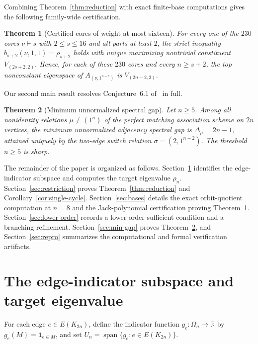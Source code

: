 \documentclass[11pt]{article}
\newtheorem{theorem}{Theorem}
\theoremstyle{remark}
\newcommand{\R}{\mathbb{R}}
\newcommand{\one}{\mathbf{1}}
\DeclareMathOperator{\spn}{span}
\begin{document}
Combining Theorem~\ref{thm:reduction} with exact finite-base computations gives
the following family-wide certification.

\begin{theorem}[Certified cores of weight at most sixteen]\label{thm:cores}
For every one of the $230$ cores $\nu \vdash s$ with $2 \le s \le 16$ and all
parts at least $2$, the strict inequality $b_{s+2}(\nu, 1, 1) = \rho_{s+2}$
holds with unique maximizing nontrivial constituent $V_{(2s+2, 2)}$. Hence, for
each of these $230$ cores and every $n \ge s+2$, the top nonconstant eigenspace
of $A_{(\nu, 1^{n-s})}$ is $V_{(2n-2,2)}$.
\end{theorem}

Our second main result resolves Conjecture~6.1 of~\cite{GuptaEtAl} in full.

\begin{theorem}[Minimum unnormalized spectral gap]\label{thm:min-gap}
Let $n \ge 5$. Among all nonidentity relations $\mu \neq (1^n)$ of the perfect
matching association scheme on $2n$ vertices, the minimum unnormalized adjacency
spectral gap is $\Delta_\mu = 2n - 1$, attained uniquely by the two-edge switch
relation $\sigma = (2, 1^{n-2})$. The threshold $n \ge 5$ is sharp.
\end{theorem}

The remainder of the paper is organized as follows. Section~\ref{sec:target}
identifies the edge-indicator subspace and computes the target eigenvalue
$\rho_n$. Section~\ref{sec:restriction} proves Theorem~\ref{thm:reduction} and
Corollary~\ref{cor:single-cycle}. Section~\ref{sec:bases} details the exact
orbit-quotient computation at $n = 8$ and the Jack-polynomial certification
proving Theorem~\ref{thm:cores}. Section~\ref{sec:lower-order} records a
lower-order sufficient condition and a branching refinement.
Section~\ref{sec:min-gap} proves Theorem~\ref{thm:min-gap}, and
Section~\ref{sec:repro} summarizes the computational and formal verification
artifacts.

\section{The edge-indicator subspace and target eigenvalue}\label{sec:target}

For each edge $e \in E(K_{2n})$, define the indicator function
$g_e \colon \Omega_n \to \R$ by $g_e(M) = \one_{e \in M}$, and set
$U_n = \spn\{g_e : e \in E(K_{2n})\}$.
\end{document}

